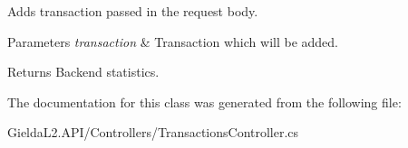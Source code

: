 Adds transaction passed in the request body. 


\begin{DoxyParams}{Parameters}
{\em transaction} & Transaction which will be added.\\
\hline
\end{DoxyParams}
\begin{DoxyReturn}{Returns}
Backend statistics.
\end{DoxyReturn}


The documentation for this class was generated from the following file\+:\begin{DoxyCompactItemize}
\item 
Gielda\+L2.\+A\+P\+I/\+Controllers/Transactions\+Controller.\+cs\end{DoxyCompactItemize}
